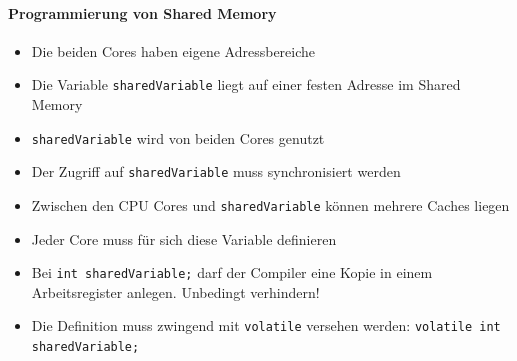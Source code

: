 \paragraph{Programmierung von Shared Memory}
\begin{minipage}[c]{14cm}
	\begin{itemize}
		\item Die beiden Cores haben eigene Adressbereiche 
		\item Die Variable \lstinline{sharedVariable} liegt auf einer festen Adresse im Shared Memory 
		\item \lstinline{sharedVariable} wird von beiden Cores genutzt
		\item  Der Zugriff auf \lstinline{sharedVariable} muss synchronisiert werden
		\item Zwischen den CPU Cores und \lstinline{sharedVariable} können mehrere Caches liegen 
		\item Jeder Core muss für sich diese Variable definieren 
		\item Bei \lstinline{int sharedVariable;} darf der Compiler eine Kopie in einem Arbeitsregister anlegen. Unbedingt verhindern!
		\item Die Definition muss zwingend mit \lstinline{volatile} versehen werden: \lstinline{volatile int sharedVariable;}	
	\end{itemize}
\end{minipage}
